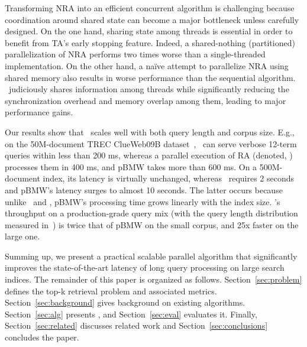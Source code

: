 Transforming NRA into an efficient concurrent algorithm is challenging because coordination around 
shared state can become a major bottleneck unless carefully designed. On the one hand,
sharing state among threads is essential in order to benefit from TA's early stopping feature.
Indeed, a shared-nothing (partitioned) parallelization of NRA performs two times 
worse than a single-threaded implementation. On the other hand, 
a na\"ive attempt to parallelize NRA using shared memory also results in 
worse performance than the sequential algorithm. \alg\ judiciously shares 
information among threads while significantly reducing the synchronization 
overhead and memory overlap among them, 
leading to major performance gains. 

Our results show that \alg\ scales well with both query length and corpus size.
E.g., on the 50M-document TREC ClueWeb09B dataset~\cite{ClueWeb09}, %
\alg\ can serve verbose 12-term queries within less than 200 ms, 
whereas a parallel execution of RA (denoted, \pRA) processes them in 400 ms, and pBMW takes more than 600 ms. 
On a 500M-document index,  its latency is virtually unchanged, whereas 
 \pRA\ requires 2 seconds and pBMW's latency surges to almost 10 seconds.  The latter occurs because unlike \alg\ and \pRA, 
pBMW's processing time grows linearly with the index size.
\alg's throughput on a production-grade query mix (with the query length distribution measured in~\cite{sigir/Guy16}) is twice that of pBMW on the small corpus, and 25x faster on the large one.


Summing up, we present a practical scalable parallel algorithm that significantly improves the state-of-the-art latency  of long query processing
on large search indices.
The remainder of this paper is organized as follows. Section~\ref{sec:problem} defines the top-k retrieval problem and associated metrics. 
Section~\ref{sec:background} gives background on existing algorithms. 
Section~\ref{sec:alg} presents \alg, and Section~\ref{sec:eval}  evaluates it.
Finally, 
Section~\ref{sec:related} discusses related work and Section~\ref{sec:conclusions} concludes the paper.